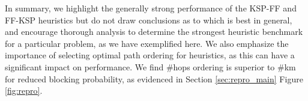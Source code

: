 


In summary, we highlight the generally strong performance of the KSP-FF and FF-KSP heuristics but do not draw conclusions as to which is best in general, and encourage thorough analysis to determine the strongest heuristic benchmark for a particular problem, as we have exemplified here. We also emphasize the importance of selecting optimal path ordering for heuristics, as this can have a significant impact on performance. We find \#hops ordering is superior to \#km for reduced blocking probability, as evidenced in Section \ref{sec:repro_main} Figure \ref{fig:repro}.

